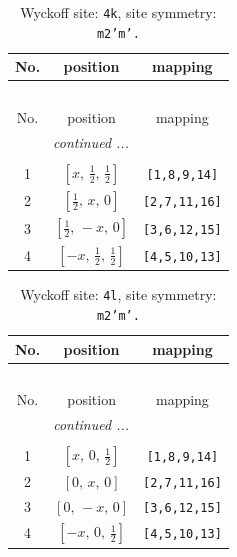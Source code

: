 \documentclass[fleqn,8pt]{jsarticle}
\begin{document}
\renewcommand{\arraystretch}{1.2}
\begin{longtable}{ccc}
\caption{Wyckoff site: {\tt 4k}, site symmetry: {\tt m2'm'.}}
 \\
 \hline \hline
No. & position & mapping \\ \hline \endfirsthead

\multicolumn{2}{l}{\tablename\ \thetable{}} \\
 \hline \hline
No. & position & mapping \\ \hline \endhead

 \hline \hline
\multicolumn{2}{r}{\footnotesize\it continued ...} \\ \endfoot

 \hline \hline
\multicolumn{2}{r}{} \\ \endlastfoot

1 & $\left[ x,\, \frac{1}{2},\, \frac{1}{2} \right]$ & {\tt [1,8,9,14]} \\ \hline
2 & $\left[ \frac{1}{2},\, x,\, 0 \right]$ & {\tt [2,7,11,16]} \\ \hline
3 & $\left[ \frac{1}{2},\, - x,\, 0 \right]$ & {\tt [3,6,12,15]} \\ \hline
4 & $\left[ - x,\, \frac{1}{2},\, \frac{1}{2} \right]$ & {\tt [4,5,10,13]} \\
\end{longtable}
\renewcommand{\arraystretch}{1.2}
\begin{longtable}{ccc}
\caption{Wyckoff site: {\tt 4l}, site symmetry: {\tt m2'm'.}}
 \\
 \hline \hline
No. & position & mapping \\ \hline \endfirsthead

\multicolumn{2}{l}{\tablename\ \thetable{}} \\
 \hline \hline
No. & position & mapping \\ \hline \endhead

 \hline \hline
\multicolumn{2}{r}{\footnotesize\it continued ...} \\ \endfoot

 \hline \hline
\multicolumn{2}{r}{} \\ \endlastfoot

1 & $\left[ x,\, 0,\, \frac{1}{2} \right]$ & {\tt [1,8,9,14]} \\ \hline
2 & $\left[ 0,\, x,\, 0 \right]$ & {\tt [2,7,11,16]} \\ \hline
3 & $\left[ 0,\, - x,\, 0 \right]$ & {\tt [3,6,12,15]} \\ \hline
4 & $\left[ - x,\, 0,\, \frac{1}{2} \right]$ & {\tt [4,5,10,13]} \\
\end{longtable}
\end{document}
